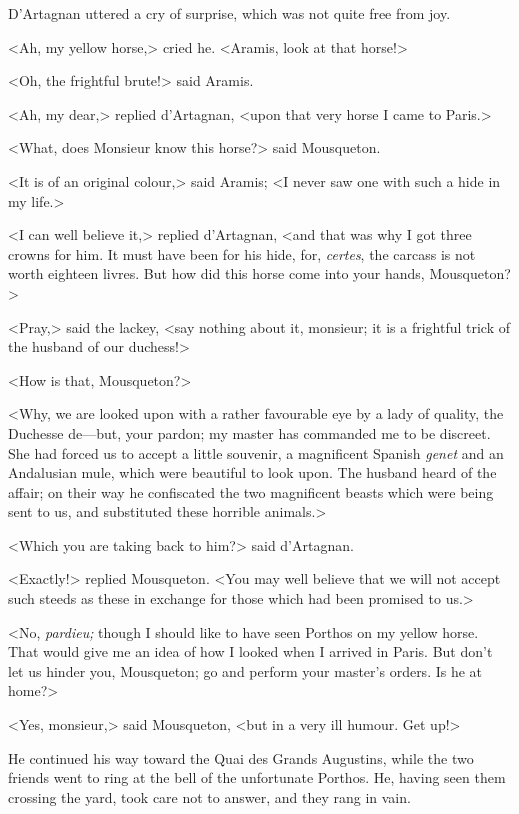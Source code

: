 D'Artagnan uttered a cry of surprise, which was not quite free from joy. 

<Ah, my yellow horse,> cried he. <Aramis, look at that horse!> 

<Oh, the frightful brute!> said Aramis. 

<Ah, my dear,> replied d'Artagnan, <upon that very horse I came to Paris.> 

<What, does Monsieur know this horse?> said Mousqueton. 

<It is of an original colour,> said Aramis; <I never saw one with such a hide in my life.> 

<I can well believe it,> replied d'Artagnan, <and that was why I got three crowns for him. It must have been for his hide, for, \textit{certes}, the carcass is not worth eighteen livres. But how did this horse come into your hands, Mousqueton?> 

<Pray,> said the lackey, <say nothing about it, monsieur; it is a frightful trick of the husband of our duchess!> 

<How is that, Mousqueton?> 

<Why, we are looked upon with a rather favourable eye by a lady of quality, the Duchesse de---but, your pardon; my master has commanded me to be discreet. She had forced us to accept a little souvenir, a magnificent Spanish \textit{genet} and an Andalusian mule, which were beautiful to look upon. The husband heard of the affair; on their way he confiscated the two magnificent beasts which were being sent to us, and substituted these horrible animals.> 

<Which you are taking back to him?> said d'Artagnan. 

<Exactly!> replied Mousqueton. <You may well believe that we will not accept such steeds as these in exchange for those which had been promised to us.> 

<No, \textit{pardieu;} though I should like to have seen Porthos on my yellow horse. That would give me an idea of how I looked when I arrived in Paris. But don't let us hinder you, Mousqueton; go and perform your master's orders. Is he at home?> 

<Yes, monsieur,> said Mousqueton, <but in a very ill humour. Get up!> 

He continued his way toward the Quai des Grands Augustins, while the two friends went to ring at the bell of the unfortunate Porthos. He, having seen them crossing the yard, took care not to answer, and they rang in vain. 

